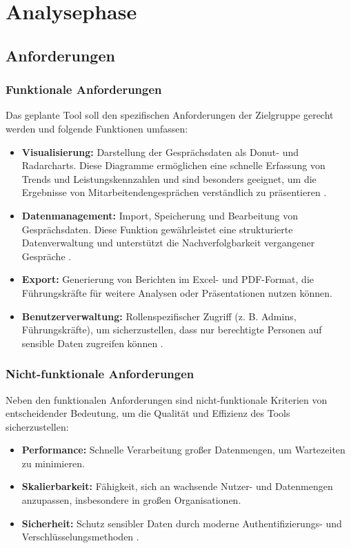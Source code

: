 \chapter{Analysephase}
\label{chap:analysephase}

\section{Anforderungen}
\subsection{Funktionale Anforderungen}
Das geplante Tool soll den spezifischen Anforderungen der Zielgruppe gerecht werden und folgende Funktionen umfassen:
\begin{itemize}
    \item \textbf{Visualisierung:} Darstellung der Gesprächsdaten als Donut- und Radarcharts. Diese Diagramme ermöglichen eine schnelle Erfassung von Trends und Leistungskennzahlen und sind besonders geeignet, um die Ergebnisse von Mitarbeitendengesprächen verständlich zu präsentieren \cite{kirk2016data, evergreen2016effective}.
    \item \textbf{Datenmanagement:} Import, Speicherung und Bearbeitung von Gesprächsdaten. Diese Funktion gewährleistet eine strukturierte Datenverwaltung und unterstützt die Nachverfolgbarkeit vergangener Gespräche \cite{bryson2011employee}.
    \item \textbf{Export:} Generierung von Berichten im Excel- und PDF-Format, die Führungskräfte für weitere Analysen oder Präsentationen nutzen können.
    \item \textbf{Benutzerverwaltung:} Rollenspezifischer Zugriff (z. B. Admins, Führungskräfte), um sicherzustellen, dass nur berechtigte Personen auf sensible Daten zugreifen können \cite{duarte2012performance}.
\end{itemize}

\subsection{Nicht-funktionale Anforderungen}
Neben den funktionalen Anforderungen sind nicht-funktionale Kriterien von entscheidender Bedeutung, um die Qualität und Effizienz des Tools sicherzustellen:
\begin{itemize}
    \item \textbf{Performance:} Schnelle Verarbeitung großer Datenmengen, um Wartezeiten zu minimieren.
    \item \textbf{Skalierbarkeit:} Fähigkeit, sich an wachsende Nutzer- und Datenmengen anzupassen, insbesondere in großen Organisationen.
    \item \textbf{Sicherheit:} Schutz sensibler Daten durch moderne Authentifizierungs- und Verschlüsselungsmethoden \cite{schober2008}.
\end{itemize}

